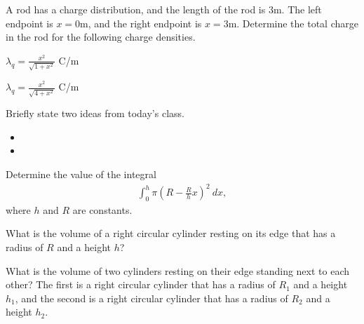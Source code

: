 \begin{problem}
\item A rod has a charge distribution, and the length of the rod is
  3m. The left endpoint is $x=0$m, and the right endpoint is
  $x=3$m. Determine the total charge in the rod for the following
  charge densities. 
  \begin{subproblem}
    \item $\lambda_q = \frac{x^2}{\sqrt{1+x^2}}$ C/m
      \vfill
    \item $\lambda_q = \frac{x^2}{\sqrt{4+x^2}}$ C/m
      \vfill
  \end{subproblem}
\end{problem}

\postClass

\begin{problem}
\item Briefly state two ideas from today's class.
  \begin{itemize}
  \item 
  \item 
  \end{itemize}
\item 
  \begin{subproblem}
    \item
  \end{subproblem}
\end{problem}



\begin{problem}
\item Determine the value of the integral
  \begin{eqnarray*}
    \int^h_0 \pi \left (R-\frac{R}{h} x\right)^2 ~ dx,
  \end{eqnarray*}
  where $h$ and $R$ are constants.
  \vfill

\item What is the volume of a right circular cylinder resting on its
  edge that has a radius of $R$ and a height $h$?

  \vfill

\item What is the volume of two cylinders resting on their edge
  standing next to each other? The first is a right circular cylinder
  that has a radius of $R_1$ and a height $h_1$, and the second is a
  right circular cylinder that has a radius of $R_2$ and a height
  $h_2$.

  \vfill

\end{problem}



